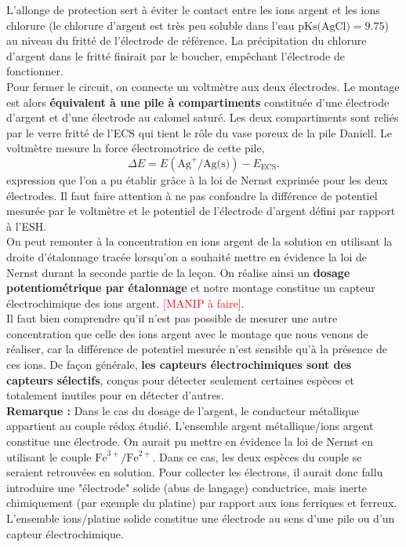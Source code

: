 \documentclass[11pt,a4paper]{report}
\begin{document}
L'allonge de protection sert à éviter le contact entre les ions argent et les ions chlorure (le chlorure d'argent est très peu soluble dans l'eau $\text{pKs(AgCl)} = 9.75$) au niveau du fritté de l'électrode de référence. La précipitation du chlorure d'argent dans le fritté finirait par le boucher, empêchant l'électrode de fonctionner.\\

Pour fermer le circuit, on connecte un voltmètre aux deux électrodes. Le montage est alors \textbf{équivalent à une pile à compartiments} constituée d'une électrode d'argent et d'une électrode au calomel saturé. Les deux compartiments sont reliés par le verre fritté de l'ECS qui tient le rôle du vase poreux de la pile Daniell. Le voltmètre mesure la force électromotrice de cette pile,
\begin{equation}
	\Delta E = E(\text{Ag}^+/\text{Ag(s)}) - E_\text{ECS}.
\end{equation}
expression que l'on a pu établir grâce à la loi de Nernst exprimée pour les deux électrodes. Il faut faire attention à ne pas confondre la différence de potentiel mesurée par le voltmètre et le potentiel de l'électrode d'argent défini par rapport à l'ESH.\\

On peut remonter à la concentration en ions argent de la solution en utilisant la droite d'étalonnage tracée lorsqu'on a souhaité mettre en évidence la loi de Nernst durant la seconde partie de la leçon. On réalise ainsi un \textbf{dosage potentiométrique par étalonnage} et notre montage constitue un capteur électrochimique des ions argent. \textcolor{red}{[MANIP à faire]}.\\

Il faut bien comprendre qu'il n'est pas possible de mesurer une autre concentration que celle des ions argent avec le montage que nous venons de réaliser, car la différence de potentiel mesurée n'est sensible qu'à la présence de ces ions. De façon générale, \textbf{les capteurs électrochimiques sont des capteurs sélectifs}, conçus pour détecter seulement certaines espèces et totalement inutiles pour en détecter d'autres.\\

\textbf{Remarque :} Dans le cas du dosage de l'argent, le conducteur métallique appartient au couple rédox étudié. L'ensemble argent métallique/ions argent constitue une électrode. On aurait pu mettre en évidence la loi de Nernst en utilisant le couple $\text{Fe}^{3+}/\text{Fe}^{2+}$. Dans ce cas, les deux espèces du couple se seraient retrouvées en solution. Pour collecter les électrons, il aurait donc fallu introduire une "électrode" solide (abus de langage) conductrice, mais inerte chimiquement (par exemple du platine) par rapport aux ions ferriques et ferreux. L'ensemble ions/platine solide constitue une électrode au sens d'une pile ou d'un capteur électrochimique.
\end{document}
